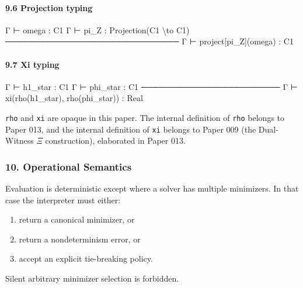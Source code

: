 \documentclass[
]{article}
\newenvironment{Shaded}{\begin{snugshade}}{\end{snugshade}}
\newcommand{\NormalTok}[1]{\textcolor[rgb]{0.12,0.11,0.11}{#1}}
\providecommand{\tightlist}{%
  \setlength{\itemsep}{0pt}\setlength{\parskip}{0pt}}
\providecommand{\tightlist}{%
  \setlength{\itemsep}{0pt}\setlength{\parskip}{0pt}}
\begin{document}
\paragraph{9.6 Projection typing}\label{projection-typing}

\begin{Shaded}
\begin{Highlighting}[]
\NormalTok{Γ ⊢ omega : C1}
\NormalTok{Γ ⊢ pi\_Z  : Projection(C1 \textbackslash{}to C1)}
\NormalTok{──────────────────────────────}
\NormalTok{Γ ⊢ project[pi\_Z](omega) : C1}
\end{Highlighting}
\end{Shaded}

\paragraph{9.7 Xi typing}\label{xi-typing}

\begin{Shaded}
\begin{Highlighting}[]
\NormalTok{Γ ⊢ h1\_star : C1}
\NormalTok{Γ ⊢ phi\_star : C1}
\NormalTok{────────────────────────}
\NormalTok{Γ ⊢ xi(rho(h1\_star), rho(phi\_star)) : Real}
\end{Highlighting}
\end{Shaded}

\texttt{rho} and \texttt{xi} are opaque in this paper. The internal definition of \texttt{rho} belongs to Paper 013, and the internal definition of \texttt{xi} belongs to Paper 009 (the Dual-Witness \(\Xi\) construction), elaborated in Paper 013.

\subsubsection{10. Operational Semantics}\label{operational-semantics}

Evaluation is deterministic except where a solver has multiple minimizers. In that case the interpreter must either:

\begin{enumerate}
\def\labelenumi{\arabic{enumi}.}
\tightlist
\item
  return a canonical minimizer, or
\item
  return a nondeterminism error, or
\item
  accept an explicit tie-breaking policy.
\end{enumerate}

Silent arbitrary minimizer selection is forbidden.
\end{document}

